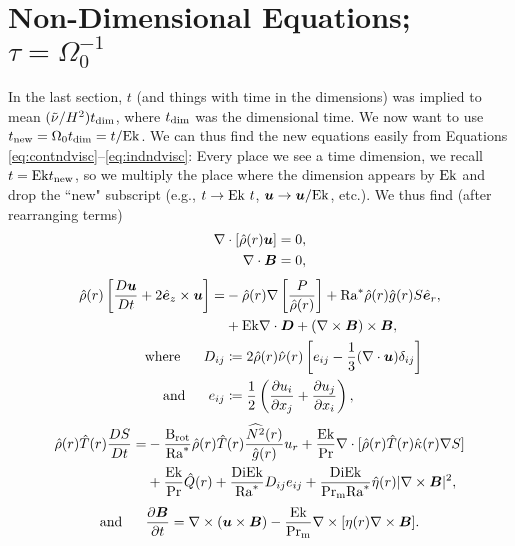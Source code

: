 \documentclass[12pt]{article}
\numberwithin{equation}{section}
\newcommand{\rhond}{\hat{\rho}}
\newcommand{\tmpnd}{\hat{T}}
\newcommand{\gnd}{\hat{g}}
\newcommand{\nund}{\hat{\nu}}
\newcommand{\kappand}{\hat{\kappa}}
\newcommand{\etand}{\hat{\eta}}
\begin{document}
\section{Non-Dimensional Equations; $\tau=\Omega_0^{-1}$}
In the last section, $t$ (and things with time in the dimensions) was implied to mean $(\tilde{\nu}/H^2) t_{\rm{dim}}$, where $t_{\rm{dim}}$ was the dimensional time. We now want to use $t_{\rm{new}}= \Omega_0t_{\rm{dim}} = t/{\rm{Ek}}$. We can thus find the new equations easily from Equations \eqref{eq:contndvisc}--\eqref{eq:indndvisc}: Every place we see a time dimension, we recall $t={\rm{Ek}} t_{\rm{new}}$, so we multiply the place where the dimension appears by ${\rm{Ek}}$ and drop the ``new" subscript (e.g., $t\rightarrow {\rm{Ek}}\ t$, $\bm{u}\rightarrow\bm{u}/{\rm{Ek}}$, etc.).  We thus find (after rearranging terms)
\begin{align}
	\Div[\rhond\ofr\vecu] &= 0\label{eq:contndrot},\\
	\Div \vecb &= 0,
\end{align}
\begin{subequations}\label{eq:momndrot}
	\begin{align}
		\rhond\ofr\left[\matderiv{\vecu} + 2\ez\times\vecu\right] = &-\rhond\ofr\nabla\left[ \frac{P}{\rhond\ofr} \right] + \ramod \rhond\ofr\gnd\ofr S\er, \nonumber\\
		&+ \ek \Div\bm{D} +(\curl\vecb)\times\vecb,\\
		\where D_{ij} &\define 2\rhond\ofr\nund\ofr \left[e_{ij} - \frac{1}{3}(\Div\vecu) \delta_{ij} \right]\\
		\andd e_{ij} &\define \frac{1}{2}\left(\pderiv{u_i}{x_j} + \pderiv{u_j}{x_i} \right),
	\end{align}
\end{subequations}
\begin{align}\label{eq:enndrot}
	\rhond\ofr\tmpnd\ofr \matderiv{S} = &- \frac{\brot}{\ramod} \rhond\ofr\tmpnd\ofr \frac{\widehat{N^2}\ofr}{\hat{g}\ofr} \ur + \frac{\ek}{\pr} \Div[\rhond\ofr \tmpnd\ofr \kappand\ofr \nabla S] \nonumber \\
	&+ \frac{\ek}{\pr} \hat{Q}(r) + \frac{\di\ek}{\ramod} D_{ij}e_{ij} + \frac{\di\ek}{\prm\ramod} \etand\ofr|\curl\vecb|^2,
\end{align}
\begin{align}\label{eq:indndrot}
	\text{and}\ \ \ \ \  \frac{\partial\bm{B}}{\partial t} = \nabla\times(\bm{u}\times\bm{B}) - \frac{{\rm{Ek}}}{{\rm{Pr_m}}} \nabla\times[\eta(r)\nabla\times\bm{B}].
\end{align}	
\end{document}
